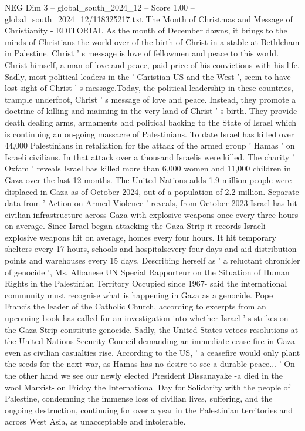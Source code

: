\begin{textsample}{NEG Dim 3 – global\_south\_2024\_12 – Score 1.00 – global\_south\_2024\_12/118325217.txt}  \label{ex:f3_neg_062}
The Month of Christmas and Message of Christianity - EDITORIAL As the month of December dawns, it brings to the minds of Christians the world over of the birth of Christ in a stable at Bethleham in Palestine.
Christ ' s message is love of fellowmen and peace to this world.
Christ himself, a man of love and peace, paid price of his convictions with his life.
Sadly, most political leaders in the ' Christian US and the West ', seem to have lost sight of Christ ' s message.Today, the political leadership in these countries, trample underfoot, Christ ' s message of love and peace.
Instead, they promote a doctrine of killing and maiming in the very land of Christ ' s birth.
They provide death dealing arms, armaments and political backing to the State of Israel which is continuing an on-going massacre of Palestinians.
To date Israel has killed over 44,000 Palestinians in retaliation for the attack of the armed group ' Hamas ' on Israeli civilians.
In that attack over a thousand Israelis were killed.
The charity ' Oxfam ' reveals Israel has killed more than 6,000 women and 11,000 children in Gaza over the last 12 months.
The United Nations adds 1.9 million people were displaced in Gaza as of October 2024, out of a population of 2.2 million.
Separate data from ' Action on Armed Violence ' reveals, from October 2023 Israel has hit civilian infrastructure across Gaza with explosive weapons once every three hours on average.
Since Israel began attacking the Gaza Strip it records Israeli explosive weapons hit on average, homes every four hours.
It hit temporary shelters every 17 hours, schools and hospitalsevery four days and aid distribution points and warehouses every 15 days.
Describing herself as ' a reluctant chronicler of genocide ', Ms.
Albanese UN Special Rapporteur on the Situation of Human Rights in the Palestinian Territory Occupied since 1967- said the international community must recognise what is happening in Gaza as a genocide.
Pope Francis the leader of the Catholic Church, according to excerpts from an upcoming book has called for an investigation into whether Israel ' s strikes on the Gaza Strip constitute genocide.
Sadly, the United States vetoes resolutions at the United Nations Security Council demanding an immediate cease-fire in Gaza even as civilian casualties rise.
According to the US, ' a ceasefire would only plant the seeds for the next war, as Hamas has no desire to see a durable peace... ' On the other hand we see our newly elected President Dissanayake -a died in the wool Marxist- on Friday the International Day for Solidarity with the people of Palestine, condemning the immense loss of civilian lives, suffering, and the ongoing destruction, continuing for over a year in the Palestinian territories and across West Asia, as unacceptable and intolerable.

\end{textsample}
